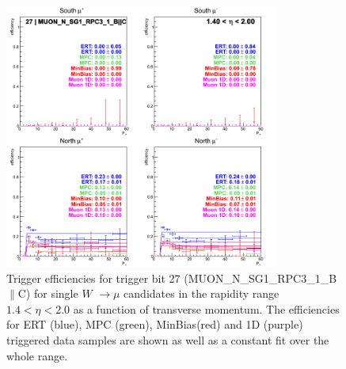 \begin{figure}[ht]
\begin{center}
\includegraphics[width=0.8\textwidth]{./figures/run13_trigeffipt_eta1_trig27_lin.png}
\caption{\label{fig:run13_trigeffipt_eta1_nper0_trig27_lin} Trigger efficiencies for trigger bit 27 (MUON\_N\_SG1\_RPC3\_1\_B$\|$C) for single $W$ $\rightarrow \mu$ candidates in the rapidity range $ 1.4 < \eta < 2.0$ as a function of transverse momentum. The efficiencies for ERT (blue), MPC (green), MinBias(red) and 1D (purple) triggered data samples are shown as well as a constant fit over the whole range.}
\end{center}
\end{figure}

